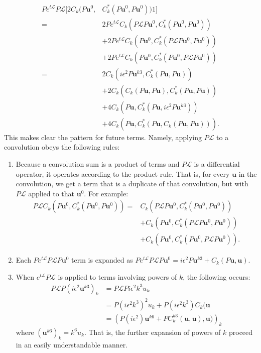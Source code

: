 \documentclass{article}
\begin{document}
\begin{align*}
Pe^{t\mathcal{L}}P\mathcal{L}[2C_k(P\mathbf{u}^0,&C_k^*(P\mathbf{u}^0,P\mathbf{u}^0))1] \\=& 2Pe^{t\mathcal{L}}C_k(P\mathcal{L}P\mathbf{u}^0,C_k^*(P\mathbf{u}^0,P\mathbf{u}^0))\\
&+2Pe^{t\mathcal{L}}C_k(P\mathbf{u}^0,C_k^*(P\mathcal{L}P\mathbf{u}^0,P\mathbf{u}^0))\\
&+2Pe^{t\mathcal{L}}C_k(P\mathbf{u}^0,C_k^*(P\mathbf{u}^0,P\mathcal{L}P\mathbf{u}^0))\\
=& 2C_k(i\epsilon^2P\mathbf{u}^{k3},C_k^*(P\mathbf{u},P\mathbf{u}))\\&+2C_k(C_k(P\mathbf{u},P\mathbf{u}),C_k^*(P\mathbf{u},P\mathbf{u}))\\
&+4C_k(P\mathbf{u},C_k^*(P\mathbf{u},i\epsilon^2 P \mathbf{u}^{k3}))\\
&+4C_k(P\mathbf{u},C_k^*(P\mathbf{u},C_k(P\mathbf{u},P\mathbf{u}))).
\end{align*}This makes clear the pattern for future terms. Namely, applying $P\mathcal{L}$ to a convolution obeys the following rules:
\begin{enumerate}
\item Because a convolution sum is a product of terms and $P\mathcal{L}$ is a differential operator, it operates according to the product rule. That is, for every $\mathbf{u}$ in the convolution, we get a term that is a duplicate of that convolution, but with $P\mathcal{L}$ applied to that $\mathbf{u}^0$. For example:
\begin{align*}
P\mathcal{L}C_k(P\mathbf{u}^0,C_k^*(P\mathbf{u}^0,P\mathbf{u}^0)) =& C_k(P\mathcal{L}P\mathbf{u}^0,C_k^*(P\mathbf{u}^0,P\mathbf{u}^0)) \\&+ C_k(P\mathbf{u}^0,C_k^*(P\mathcal{L}P\mathbf{u}^0,P\mathbf{u}^0)) \\&+ C_k(P\mathbf{u}^0,C_k^*(P\mathbf{u}^0,P\mathcal{L}P\mathbf{u}^0)).
\end{align*}
\item Each $Pe^{t\mathcal{L}}P\mathcal{L}P\mathbf{u}^0$ term is expanded as $Pe^{t\mathcal{L}}P\mathcal{L}P\mathbf{u}^0 = i\epsilon^2 P \mathbf{u}^{k3} + C_k(P\mathbf{u},\mathbf{u})$.
\item When $e^{t\mathcal{L}}P\mathcal{L}$ is applied to terms involving powers of $k$, the following occurs:
\begin{align*}
P\mathcal{L}P (i\epsilon^2\mathbf{u}^{k3})_k &= P\mathcal{L}P i\epsilon^2k^3 u_k \\&= P(i\epsilon^2 k^3)^2 u_k + P(i\epsilon^2 k^3)C_k(\mathbf{u}\\&=\left(P(i\epsilon^2)\mathbf{u}^{k6}+PC_k^{k3}(\mathbf{u},\mathbf{u}),\mathbf{u})\right)_k
\end{align*}where $(\mathbf{u}^{k6})_k=k^6 u_k$. That is, the further expansion of powers of $k$ proceed in an easily understandable manner.
\end{enumerate}
\end{document}
